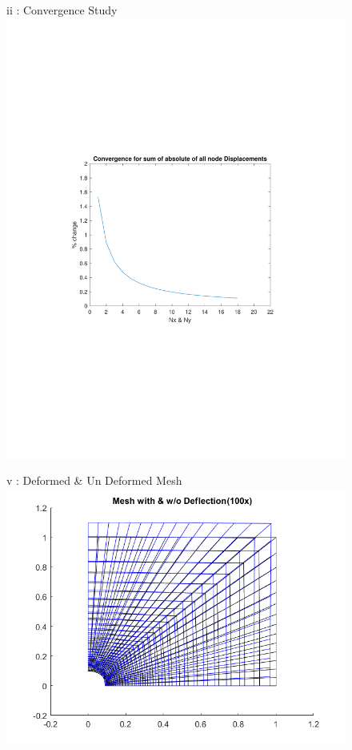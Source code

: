 \documentclass{article}
\begin{document}
\begin{figure}[t]
	ii : Convergence Study
	\includegraphics[width=20cm]{convergence study}
	\centering
\end{figure}

\begin{figure}[t]
	v : Deformed \& Un Deformed Mesh
	\includegraphics[width=20cm]{mesh}
	\centering
\end{figure}
\end{document}
